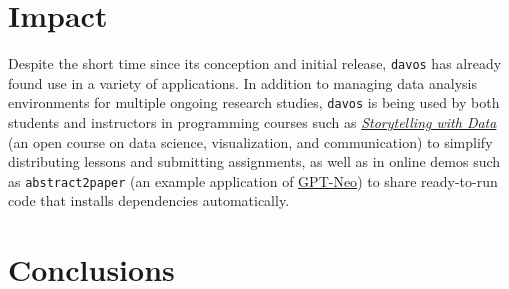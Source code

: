 \documentclass[preprint,12pt, a4paper]{elsarticle}
\begin{document}
\section{Impact}

Despite the short time since its conception and initial release, \texttt{davos} has already found use in a variety of applications. 
In addition to managing data analysis environments for multiple ongoing research studies, \texttt{davos} is being used by both students and instructors in programming courses such as \href{https://github.com/ContextLab/storytelling-with-data}{\textit{Storytelling with Data}} \cite{Mann21b} (an open course on data science, visualization, and communication) to simplify distributing lessons and submitting assignments, as well as in online demos such as {\texttt{abstract2paper}} \cite{Mann21a} (an example application of \href{https://github.com/EleutherAI/gpt-neo}{GPT-Neo}) to share ready-to-run code that installs dependencies automatically.








\section{Conclusions}
\end{document}
